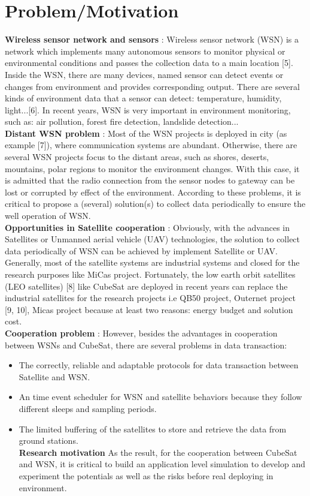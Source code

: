 \section{Problem/Motivation}
\textbf{Wireless sensor network and sensors} : Wireless sensor network (WSN) is a network which
implements many autonomous sensors to monitor physical or environmental conditions and passes
the collection data to a main location [5]. Inside the WSN, there are many devices, named sensor
can detect events or changes from environment and provides corresponding output. There are
several kinds of environment data that a sensor can detect: temperature, humidity, light...[6]. In
recent years, WSN is very important in environment monitoring, such as: air pollution, forest fire
detection, landslide detection... \\
\textbf{Distant WSN problem }: Most of the WSN projects is deployed in city (as example [7]), where
communication systems are abundant. Otherwise, there are several WSN projects focus to the
distant areas, such as shores, deserts, mountains, polar regions to monitor the environment changes.
With this case, it is admitted that the radio connection from the sensor nodes to gateway can be
lost or corrupted by effect of the environment. According to these problems, it is critical to propose
a (several) solution(s) to collect data periodically to ensure the well operation of WSN. \\
\textbf{Opportunities in Satellite cooperation} : Obviously, with the advances in Satellites or Unmanned
aerial vehicle (UAV) technologies, the solution to collect data periodically of WSN can
be achieved by implement Satellite or UAV. Generally, most of the satellite systems are industrial
systems and closed for the research purposes like MiCas project. Fortunately, the low earth orbit
satellites (LEO satellites) [8] like CubeSat are deployed in recent years can replace the industrial
satellites for the research projects i.e QB50 project, Outernet project [9, 10], Micas project because
at least two reasons: energy budget and solution cost. \\
\textbf{Cooperation problem} : However, besides the advantages in cooperation between WSNs and
CubeSat, there are several problems in data transaction:
\begin{itemize}
\item The correctly, reliable and adaptable protocols for data transaction between Satellite and
WSN.
\item An time event scheduler for WSN and satellite behaviors because they follow different sleeps
and sampling periods.
\item The limited buffering of the satellites to store and retrieve the data from ground stations. \\
\textbf{Research motivation} As the result, for the cooperation between CubeSat and WSN, it is
critical to build an application level simulation to develop and experiment the potentials as well
as the risks before real deploying in environment. 
\end{itemize}


